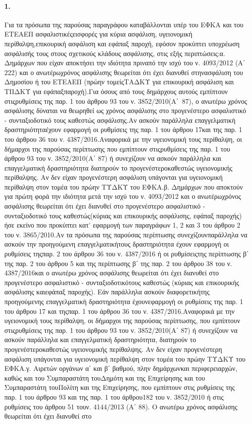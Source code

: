 \documentclass[a4paper,oneside, 10pt]{book}
\begin{document}
\paragraph { 1. } Για τα πρόσωπα της παρούσας παραγράφου καταβάλλονται υπέρ του ΕΦΚΑ και του ΕΤΕΑΕΠ ασφαλιστικέςεισφορές για κύρια ασφάλιση, υγειονομική περίθαλψη,επικουρική ασφάλιση και εφάπαξ παροχή, εφόσον προκύπτει υποχρέωση ασφάλισής τους στους σχετικούς κλάδους ασφάλισης, στις εξής περιπτώσεις:α. Δημάρχων που είχαν αποκτήσει την ιδιότητα πριναπό την ισχύ του ν. 4093/2012 (Α΄ 222) και ο ανωτέρωχρόνος ασφάλισης θεωρείται ότι έχει διανυθεί στηνασφάλιση του Δημοσίου ή του ΕΤΕΑΕΠ (πρώην τομείςΤΑΔΚΥ για επικουρική ασφάλιση και ΤΠΔΚΥ για εφάπαξπαροχή).Για όσους από τους δημάρχους αυτούς εμπίπτουν στιςρυθμίσεις της παρ. 1 του άρθρου 93 του ν. 3852/2010(Α΄ 87), ο ανωτέρω χρόνος ασφάλισης δύναται να θεωρηθεί ως χρόνος ασφάλισης στο προγενέστερο ασφαλιστικό - συνταξιοδοτικό τους καθεστώς ασφάλισης.Αν ασκούν παράλληλα επαγγελματική δραστηριότηταέχουν εφαρμογή οι ρυθμίσεις της παρ. 1 του άρθρου 17και της παρ. 1 του άρθρου 36 του ν. 4387/2016.Αναφορικά με την υγειονομική τους περίθαλψη, οι δήμαρχοι της παρούσας περίπτωσης που εμπίπτουν στιςρυθμίσεις της παρ. 1 του άρθρου 93 του ν. 3852/2010(Α΄ 87) ή συνεχίζουν να ασκούν παράλληλα και επαγγελματική δραστηριότητα διατηρούν το προγενέστεροκαθεστώς υγειονομικής περίθαλψης. Αν δεν είχαν προγενέστερη ασφάλιση υπάγονται για υγειονομική περίθαλψη στον τομέα του πρώην ΤΥΔΚΥ του ΕΦΚΑ.β. Δημάρχων που αποκτούν για πρώτη φορά την ιδιότητα μετά την ισχύ του ν. 4093/2012 και ο ανωτέρωχρόνος ασφάλισης θεωρείται ότι έχει διανυθεί στο προγενέστερο ασφαλιστικό - συνταξιοδοτικό τους καθεστώς(κύριας και επικουρικής ασφάλισης, εφάπαξ παροχής) ήσε εκείνο που προκύπτει κατ’ εφαρμογή των παραγράφων 1, 2 και 3 του άρθρου 2 του ν. 3865/2010.Αν τα πρόσωπα της παρούσας περίπτωσης συνεχίζουνπαράλληλα να ασκούν την προηγούμενη επαγγελματικήτους δραστηριότητα έχουν εφαρμογή οι ρυθμίσεις τηςπαρ. 2 του άρθρου 36 του ν. 4387/2016 ή οι ρυθμίσειςτης περίπτωσης β΄ της παρ. 2 του άρθρου 5 και της περίπτωσης β΄ της παρ. 2 του άρθρου 38 του ν. 4387/2016και ο ανωτέρω χρόνος ασφάλισης θεωρείται ότι έχει διανυθεί στο προγενέστερο ασφαλιστικό - συνταξιοδοτικότους καθεστώς (κύριας και επικουρικής ασφάλισης καιεφάπαξ παροχής). Εάν παράλληλα ασκούν διαφορετικήτης προηγούμενης επαγγελματική δραστηριότητα έχουνεφαρμογή οι ρυθμίσεις της παρ. 1 του άρθρου 17 και τηςπαρ. 1 του άρθρου 36 του ν. 4387/2016.Αναφορικά με την υγειονομική τους περίθαλψη, οι δήμαρχοι της παρούσας περίπτωσης, που εμπίπτουν στιςρυθμίσεις της παρ. 1 του άρθρου 93 του ν. 3852/2010(Α΄ 87) ή συνεχίζουν να ασκούν παράλληλα και επαγγελματική δραστηριότητα, διατηρούν το προγενέστεροκαθεστώς υγειονομικής περίθαλψης. Αν δεν είχαν προγενέστερη ασφάλιση υπάγονται για υγειονομική περίθαλψη στον τομέα του πρώην ΤΥΔΚΥ του ΕΦΚΑ.γ. Αιρετών οργάνων α΄ και β΄ βαθμού, πλην δημάρχωνκαι περιφερειαρχών, καθώς και του Συμπαραστάτη τουΔημότη και της Επιχείρησης και του Συμπαραστάτη τουΠολίτη και της Επιχείρησης, που εμπίπτουν στις ρυθμίσεις της παρ. 1 του άρθρου 93 και της παρ. 1 του άρθρου182 του ν. 3852/2010 ή στις ρυθμίσεις του άρθρου 51 τουν. 4144/2013 (Α΄ 88). Ο ανωτέρω χρόνος ασφάλισης θεωρείται ότι έχει διανυθεί στο 
\end{document}
